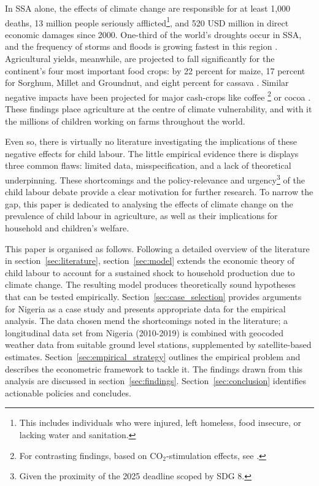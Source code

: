 \documentclass[a4paper,12pt]{article}
\theoremstyle{plain}
\theoremstyle{definition}
\theoremstyle{definition}
\theoremstyle{definition}
\theoremstyle{definition}
\begin{document}
In SSA alone, the effects of climate change are responsible for at least 1,000 deaths, 13 million people seriously afflicted\footnote{This includes individuals who were injured, left homeless, food insecure, or lacking water and sanitation.}, and 520 USD million in direct economic damages since 2000. One-third of the world’s droughts occur in SSA, and the frequency of storms and floods is growing fastest in this region \citep{IMF2020}. Agricultural yields, meanwhile, are projected to fall significantly for the continent's four most important food crops: by 22 percent for maize, 17 percent for Sorghum, Millet and Groundnut, and eight percent for cassava \citep{Schlenker2010}. Similar negative impacts have been projected for major cash-crops like coffee \citep{Craparo2015}\footnote{For contrasting findings, based on CO$_2$-stimulation effects, see \citep{DaMatta2019}.} or cocoa \citep{Boeckx2020}. These findings place agriculture at the centre of climate vulnerability, and with it the millions of children working on farms throughout the world.

Even so, there is virtually no literature investigating the implications of these negative effects for child labour. The little empirical evidence there is displays three common flaws: limited data, misspecification, and a lack of theoretical underpinning. These shortcomings and the policy-relevance and urgency\footnote{Given the proximity of the 2025 deadline scoped by SDG 8.} of the child labour debate provide a clear motivation for further research. To narrow the gap, this paper is dedicated to analysing the effects of climate change on the prevalence of child labour in agriculture, as well as their implications for household and children’s welfare.

This paper is organised as follows. Following a detailed overview of the literature in section~\ref{sec:literature}, section~\ref{sec:model} extends the economic theory of child labour to account for a sustained shock to household production due to climate change. The resulting model produces theoretically sound hypotheses that can be tested empirically. Section~\ref{sec:case_selection} provides arguments for Nigeria as a case study and presents appropriate data for the empirical analysis. The data chosen mend the shortcomings noted in the literature; a longitudinal data set from Nigeria (2010-2019) is combined with geocoded weather data from suitable ground level stations, supplemented by satellite-based estimates. Section~\ref{sec:empirical_strategy} outlines the empirical problem and describes the econometric framework to tackle it. The findings drawn from this analysis are discussed in section~\ref{sec:findings}. %
Section~\ref{sec:conclusion} identifies actionable policies and concludes.
\end{document}
